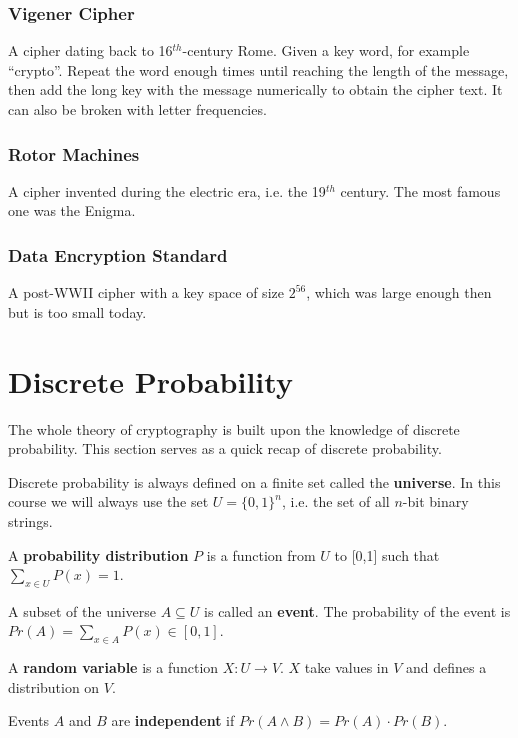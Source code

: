 \subsubsection{Vigener Cipher}
A cipher dating back to 16$^{th}$-century Rome. Given a key word, for example ``crypto''. Repeat the word enough times until reaching the length of the message, then add the long key with the message numerically to obtain the cipher text. It can also be broken with letter frequencies. 
\subsubsection{Rotor Machines}
A cipher invented during the electric era, i.e. the 19$^{th}$ century. The most famous one was the Enigma.
\subsubsection{Data Encryption Standard}
A post-WWII cipher with a key space of size $2^{56}$, which was large enough then but is too small today. 
\section{Discrete Probability}
The whole theory of cryptography is built upon the knowledge of discrete probability. This section serves as a quick recap of discrete probability.

Discrete probability is always defined on a finite set called the \textbf{universe}. In this course we will always use the set $U=\{0,1\}^n$, i.e. the set of all $n$-bit binary strings.
\begin{definition}
A \textbf{probability distribution} $P$ is a function from $U$ to [0,1] such that $\sum\limits_{x\in U}P(x)=1$.
\end{definition}
\begin{definition}
A subset of the universe $A\subseteq U$ is called an \textbf{event}. The probability of the event is $Pr(A)=\sum\limits_{x\in A}P(x)\in[0,1]$.
\end{definition}
\begin{definition}
A \textbf{random variable} is a function $X:U\rightarrow V$. $X$ take values in $V$ and defines a distribution on $V$.
\end{definition}
\begin{definition}
Events $A$ and $B$ are \textbf{independent} if $Pr(A\land B)=Pr(A)\cdot Pr(B)$.
\end{definition}

